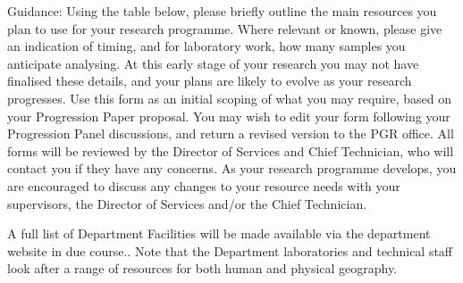 \documentclass{article}
\begin{document}
Guidance: Using the table below, please briefly outline the main resources you plan to use for your research programme. Where relevant or known, please give an indication of timing, and for laboratory work, how many samples you anticipate analysing. At this early stage of your research you may not have finalised these details, and your plans are likely to evolve as your research progresses. Use this form as an initial scoping of what you may require, based on your Progression Paper proposal. You may wish to edit your form following your Progression Panel discussions, and return a revised version to the PGR office. All forms will be reviewed by the Director of Services and Chief Technician, who will contact you if they have any concerns. As your research programme develops, you are encouraged to discuss any changes to your resource needs with your supervisors, the Director of Services and/or the Chief Technician. 

A full list of Department Facilities will be made available via the department website in due course.. Note that the Department laboratories and technical staff look after a range of resources for both human and physical geography.
\end{document}

